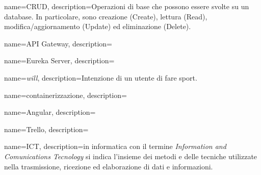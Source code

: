 {
    name={CRUD},
    description={Operazioni di base che possono essere svolte su un database. In particolare,
    sono creazione (Create), lettura (Read), modifica/aggiornamento (Update) ed
    eliminazione (Delete).}
}

{
    name={API Gateway},
    description={}
}

{
    name={Eureka Server},
    description={}
}


{
    name={\textit{will}},
    description={Intenzione di un utente di fare sport.}
}


{
    name={containerizzazione},
    description={}
}

{
    name={Angular},
    description={}
}

{
    name={Trello},
    description={}
}

{
    name={ICT},
    description={in informatica con il termine \textit{Information and Comunications Tecnology} 
    si indica l'insieme dei metodi e delle tecniche utilizzate nella trasmissione, ricezione 
    ed elaborazione di dati e informazioni.}
}


